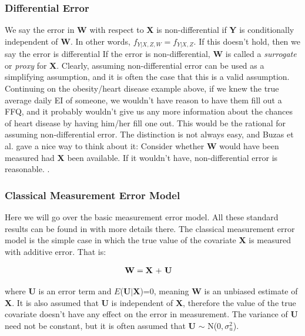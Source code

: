 \documentclass[11pt]{article}\usepackage[]{graphicx}\usepackage[]{color}
\begin{document}
\subsubsection{Differential Error}

 We say the error in {\bf W} with respect to {\bf X} is non-differential if {\bf Y} is conditionally independent of {\bf W}. In other words, $f_{Y|X,Z,W}=f_{Y|X,Z}$. If this doesn't hold, then we say the error is differential If the error is non-differential, {\bf W} is called a \emph{surrogate} or \emph{proxy} for {\bf X}. Clearly, assuming non-differential error can be used as a simplifying assumption, and it is often the case that this is a valid assumption. Continuing on the obesity/heart disease example above, if we knew the true average daily EI of someone, we wouldn't have reason to have them fill out a FFQ, and it probably wouldn't give us any more information about the chances of heart disease by having him/her fill one out. This would be the rational for assuming non-differential error.  The distinction is not always easy, and Buzas et al. \cite{buzas} gave a nice way to think about it: Consider whether {\bf W} would have been measured had {\bf X} been available. If it wouldn't have, non-differential error is reasonable. . 

\subsubsection{Classical Measurement Error Model}
Here we will go over the basic measurement error model. All these standard results can be found in \cite{linear} with more details there. The classical measurement error model is the simple case in which the true value of the covariate {\bf X} is measured with additive error. That is:

\begin{align}
	\text{{\bf W}} &= \text{{\bf X} + {\bf U}}
	\label{classical}
\end{align}

where {\bf U} is an error term and $E$({\bf U$|$X})=0, meaning {\bf W} is an unbiased estimate of {\bf X}. It is also assumed that {\bf U} is independent of {\bf X}, therefore the value of the true covariate doesn't have any effect on the error in measurement. The variance of {\bf U} need not be constant, but it is often assumed that {\bf U} $\sim$ N($0,\sigma_u^2$). \\
\end{document}
